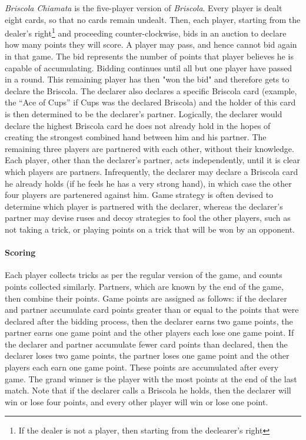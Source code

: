 \documentclass[a4paper]{article}
\begin{document}
\emph{Briscola Chiamata} is the five-player version of \emph{Briscola}. Every player is dealt eight cards, so that no cards remain undealt. Then, each player, starting from the dealer's right\footnote{If the dealer is not a player, then starting from the declearer's right} and proceeding counter-clockwise, bids in an auction to declare how many points they will score. A player may pass, and hence cannot bid again in that game. The bid represents the number of points that player believes he is capable of accumulating. Bidding continues until all but one player have passed in a round. This remaining player has then "won the bid" and therefore gets to declare the Briscola. The declarer also declares a specific Briscola card (example, the ``Ace of Cups'' if Cups was the declared Briscola) and the holder of this card is then determined to be the declarer's partner. Logically, the declarer would declare the highest Briscola card he does not already hold in the hopes of creating the strongest combined hand between him and his partner.
The remaining three players are partnered with each other, without their knowledge. Each player, other than the declarer's partner, acts independently, until it is clear which players are partners. Infrequently, the declarer may declare a Briscola card he already holds (if he feels he has a very strong hand), in which case the other four players are partenered against him.
Game strategy is often devised to determine which player is partnered with the declarer, whereas the declarer's partner may devise ruses and decoy strategies to fool the other players, such as not taking a trick, or playing points on a trick that will be won by an opponent.

\paragraph{Scoring}

Each player collects tricks as per the regular version of the game, and counts points collected similarly. Partners, which are known by the end of the game, then combine their points. Game points are assigned as follows: if the declarer and partner accumulate card points greater than or equal to the points that were declared after the bidding process, then the declarer earns two game points, the partner earns one game point and the other players each lose one game point. If the declarer and partner accumulate fewer card points than declared, then  the declarer loses two game points, the partner loses one game point and the other players each earn one game point. These points are accumulated after every game. The grand winner is the player with the most points at the end of the last match. Note that if the declarer calls a Briscola he holds, then the declarer will win or lose four points, and every other player will win or lose one point.
\end{document}

